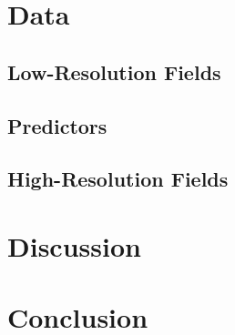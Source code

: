 \documentclass[11pt,a4paper]{amsart}
\theoremstyle{plain}
\theoremstyle{definition}
\theoremstyle{remark}
\theoremstyle{remark}
\theoremstyle{definition}
\newcommand{\1}{\mathbbm{1}}
\begin{document}
    \section{Data}
    \subsection{Low-Resolution Fields}
    \subsection{Predictors}
    \subsection{High-Resolution Fields}
  \section{Discussion}
  \section*{Conclusion}
  
  \newpage
  
  
\end{document}
